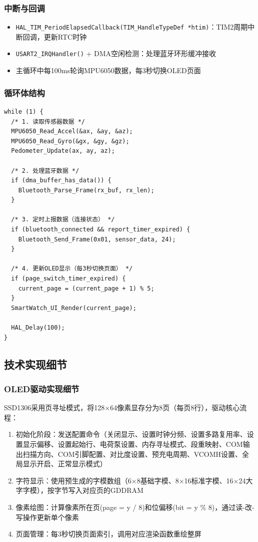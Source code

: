 \subsubsection{中断与回调}
\begin{itemize}
    \item \verb|HAL_TIM_PeriodElapsedCallback(TIM_HandleTypeDef *htim)|：TIM2周期中断回调，更新RTC时钟
    \item \verb|USART2_IRQHandler()| + DMA空闲检测：处理蓝牙环形缓冲接收
    \item 主循环中每100ms轮询MPU6050数据，每3秒切换OLED页面
\end{itemize}

\subsubsection{循环体结构}
\begin{verbatim}
while (1) {
  /* 1. 读取传感器数据 */
  MPU6050_Read_Accel(&ax, &ay, &az);
  MPU6050_Read_Gyro(&gx, &gy, &gz);
  Pedometer_Update(ax, ay, az);

  /* 2. 处理蓝牙数据 */
  if (dma_buffer_has_data()) {
    Bluetooth_Parse_Frame(rx_buf, rx_len);
  }

  /* 3. 定时上报数据（连接状态） */
  if (bluetooth_connected && report_timer_expired) {
    Bluetooth_Send_Frame(0x01, sensor_data, 24);
  }

  /* 4. 更新OLED显示（每3秒切换页面） */
  if (page_switch_timer_expired) {
    current_page = (current_page + 1) % 5;
  }
  SmartWatch_UI_Render(current_page);

  HAL_Delay(100);
}
\end{verbatim}

\subsection{技术实现细节}

\subsubsection{OLED驱动实现细节}
SSD1306采用页寻址模式，将128$\times$64像素显存分为8页（每页8行），驱动核心流程：
\begin{enumerate}
    \item 初始化阶段：发送配置命令（关闭显示、设置时钟分频、设置多路复用率、设置显示偏移、设置起始行、电荷泵设置、内存寻址模式、段重映射、COM输出扫描方向、COM引脚配置、对比度设置、预充电周期、VCOMH设置、全局显示开启、正常显示模式）
    \item 字符显示：使用预生成的字模数组（6$\times$8基础字模、8$\times$16标准字模、16$\times$24大字字模），按字节写入对应页的GDDRAM
    \item 像素绘图：计算像素所在页(page = y / 8)和位偏移(bit = y \% 8)，通过读-改-写操作更新单个像素
    \item 页面管理：每3秒切换页面索引，调用对应渲染函数重绘整屏
\end{enumerate}


